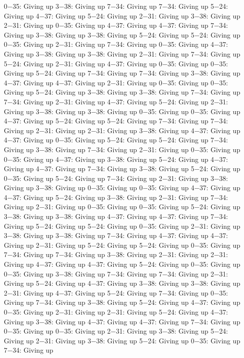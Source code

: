 0−35: Giving up
3−38: Giving up
7−34: Giving up
7−34: Giving up
5−24: Giving up
4−37: Giving up
5−24: Giving up
2−31: Giving up
3−38: Giving up
2−31: Giving up
0−35: Giving up
4−37: Giving up
4−37: Giving up
7−34: Giving up
3−38: Giving up
3−38: Giving up
5−24: Giving up
5−24: Giving up
0−35: Giving up
2−31: Giving up
7−34: Giving up
0−35: Giving up
4−37: Giving up
3−38: Giving up
3−38: Giving up
2−31: Giving up
7−34: Giving up
5−24: Giving up
2−31: Giving up
4−37: Giving up
0−35: Giving up
0−35: Giving up
5−24: Giving up
7−34: Giving up
7−34: Giving up
3−38: Giving up
4−37: Giving up
4−37: Giving up
2−31: Giving up
0−35: Giving up
0−35: Giving up
5−24: Giving up
3−38: Giving up
3−38: Giving up
7−34: Giving up
7−34: Giving up
2−31: Giving up
4−37: Giving up
5−24: Giving up
2−31: Giving up
3−38: Giving up
3−38: Giving up
0−35: Giving up
0−35: Giving up
4−37: Giving up
5−24: Giving up
5−24: Giving up
7−34: Giving up
7−34: Giving up
2−31: Giving up
2−31: Giving up
3−38: Giving up
4−37: Giving up
4−37: Giving up
0−35: Giving up
5−24: Giving up
5−24: Giving up
7−34: Giving up
3−38: Giving up
7−34: Giving up
2−31: Giving up
0−35: Giving up
0−35: Giving up
4−37: Giving up
3−38: Giving up
5−24: Giving up
4−37: Giving up
4−37: Giving up
7−34: Giving up
3−38: Giving up
5−24: Giving up
0−35: Giving up
5−24: Giving up
7−34: Giving up
2−31: Giving up
3−38: Giving up
3−38: Giving up
0−35: Giving up
0−35: Giving up
4−37: Giving up
4−37: Giving up
5−24: Giving up
3−38: Giving up
2−31: Giving up
7−34: Giving up
2−31: Giving up
0−35: Giving up
0−35: Giving up
5−24: Giving up
3−38: Giving up
3−38: Giving up
4−37: Giving up
4−37: Giving up
7−34: Giving up
5−24: Giving up
5−24: Giving up
0−35: Giving up
2−31: Giving up
3−38: Giving up
3−38: Giving up
7−34: Giving up
4−37: Giving up
4−37: Giving up
2−31: Giving up
5−24: Giving up
5−24: Giving up
0−35: Giving up
7−34: Giving up
7−34: Giving up
3−38: Giving up
2−31: Giving up
2−31: Giving up
4−37: Giving up
4−37: Giving up
5−24: Giving up
0−35: Giving up
0−35: Giving up
3−38: Giving up
7−34: Giving up
7−34: Giving up
2−31: Giving up
5−24: Giving up
4−37: Giving up
3−38: Giving up
3−38: Giving up
2−31: Giving up
4−37: Giving up
5−24: Giving up
7−34: Giving up
0−35: Giving up
7−34: Giving up
3−38: Giving up
5−24: Giving up
4−37: Giving up
0−35: Giving up
2−31: Giving up
2−31: Giving up
5−24: Giving up
4−37: Giving up
3−38: Giving up
4−37: Giving up
4−37: Giving up
7−34: Giving up
0−35: Giving up
0−35: Giving up
2−31: Giving up
3−38: Giving up
5−24: Giving up
2−31: Giving up
3−38: Giving up
5−24: Giving up
0−35: Giving up
7−34: Giving up
